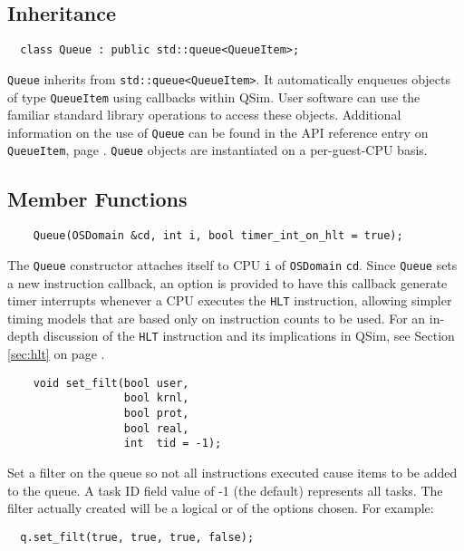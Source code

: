 \documentclass[letterpaper, 10pt]{book}
\begin{document}
\subsection{Inheritance}
\begin{verbatim}
  class Queue : public std::queue<QueueItem>;
\end{verbatim}

\texttt{Queue} inherits from \texttt{std::queue<QueueItem>}. It automatically
enqueues objects of type \texttt{QueueItem} using callbacks within QSim. User
software can use the familiar standard library operations to access these 
objects. Additional information on the use of \texttt{Queue} can be found 
in the API reference entry on \texttt{QueueItem}, page 
\pageref{struct:QueueItem}. \texttt{Queue} objects are instantiated on a
per-guest-CPU basis.

\subsection{Member Functions}
\label{func:Queue} \begin{verbatim}
    Queue(OSDomain &cd, int i, bool timer_int_on_hlt = true);
\end{verbatim}
The \texttt{Queue} constructor attaches itself to CPU \texttt{i} of 
\texttt{OSDomain} \texttt{cd}. Since \texttt{Queue} sets a new instruction
callback, an option is provided to have this callback generate timer interrupts
whenever a CPU executes the \texttt{HLT} instruction, allowing simpler timing
models that are based only on instruction counts to be used. For an in-depth
discussion of the \texttt{HLT} instruction and its implications in QSim, see
Section \ref{sec:hlt} on page \pageref{sec:hlt}.

\label{func:set_filt} \begin{verbatim}
    void set_filt(bool user, 
                  bool krnl, 
                  bool prot, 
                  bool real,
                  int  tid = -1);
\end{verbatim}

Set a filter on the queue so not all instructions executed cause items to be
added to the queue. A task ID field value of -1 (the default) represents all
tasks. The filter actually created will be a logical or of the options chosen. 
For example:

\begin{verbatim}
  q.set_filt(true, true, true, false);
\end{verbatim}
\end{document}
